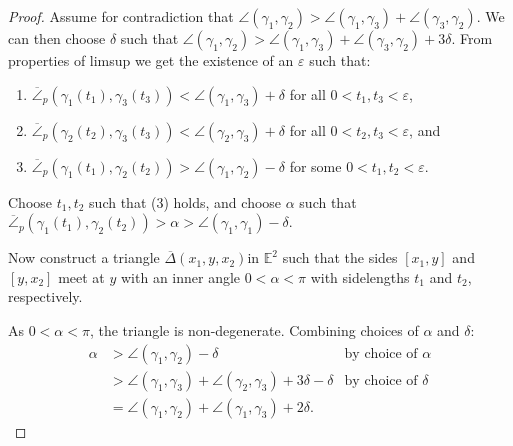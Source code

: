 \documentclass[11pt, a4paper, oneside]{memoir}
\theoremstyle{plain}\newtheorem{theorem}[subsection]{Theorem}
\theoremstyle{definition}
\newcommand{\parenum}{\setenumerate[1]{label=\textbf{(\arabic*)}}}
\newcommand{\E}{\mathbb{E}}
\begin{document}
\begin{proof}
Assume for contradiction that \(\angle(\gamma_1,\gamma_2)>\angle(\gamma_1,\gamma_3)+\angle(\gamma_3,\gamma_2)\).
We can then choose \(\delta\) such that \(\angle(\gamma_1,\gamma_2)>\angle(\gamma_1,\gamma_3)+\angle(\gamma_3,\gamma_2)+3\delta\).
From properties of limsup we get the existence of an \(\varepsilon\) such that:
\parenum
\begin{enumerate}
    \item \(\overline{\angle}_p(\gamma_1(t_1),\gamma_3(t_3))<\angle(\gamma_1,\gamma_3)+\delta\) for all \(0<t_1,t_3<\varepsilon\),
    \item \(\overline{\angle}_p(\gamma_2(t_2),\gamma_3(t_3))<\angle(\gamma_2,\gamma_3)+\delta\) for all \(0<t_2,t_3<\varepsilon\), and
    \item \(\overline{\angle}_p(\gamma_1(t_1),\gamma_2(t_2))>\angle(\gamma_1,\gamma_2)-\delta\) for some \(0<t_1,t_2<\varepsilon\).
\end{enumerate}
Choose \(t_1,t_2\) such that (3) holds, and choose \(\alpha\) such that \(\overline{\angle}_p(\gamma_1(t_1),\gamma_2(t_2))>\alpha >\angle(\gamma_1,\gamma_1)-\delta\).

Now construct a triangle \(\overline{\Delta}(x_1,y,x_2)\)in \(\E^2\) such that the sides \([x_1,y]\) and \([y,x_2]\) meet at \(y\) with an inner angle \(0<\alpha<\pi\) with sidelengths \(t_1\) and \(t_2\), respectively.

As \(0<\alpha<\pi\), the triangle is non-degenerate.
Combining choices of \(\alpha\) and \(\delta\):
\begin{align*}
\alpha  &>\angle(\gamma_1,\gamma_2)-\delta          &\text{by choice of } \alpha\\
        &>\angle(\gamma_1,\gamma_3)+\angle(\gamma_2,\gamma_3)+3\delta-\delta    &\text{by choice of }\delta\\
        &=\angle(\gamma_1,\gamma_2)+\angle(\gamma_1,\gamma_3)+2\delta.
\end{align*}


\end{proof}
\end{document}
